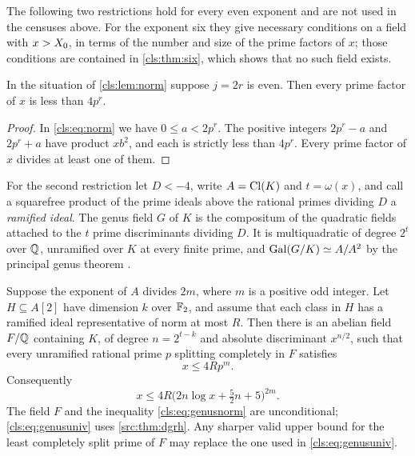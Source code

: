 The following two restrictions hold for every even exponent and are not used in the
censuses above. For the exponent six they give necessary conditions on a field with
$x>X_0$, in terms of the number and size of the prime factors of $x$; those conditions
are contained in \cref{cls:thm:six}, which shows that no such field exists.

\begin{lemma}\label{cls:lem:pplus}
In the situation of \cref{cls:lem:norm} suppose $j=2r$ is even. Then every prime factor
of $x$ is less than $4p^r$.
\end{lemma}

\begin{proof}
In \eqref{cls:eq:norm} we have $0\le a<2p^r$. The positive integers $2p^r-a$ and
$2p^r+a$ have product $xb^2$, and each is strictly less than $4p^r$. Every prime factor
of $x$ divides at least one of them.
\end{proof}

For the second restriction let $D<-4$, write $A=\operatorname{Cl}(K)$ and $t=\omega(x)$, and call a
squarefree product of the prime ideals above the rational primes dividing $D$ a
\emph{ramified ideal}. The genus field $G$ of $K$ is the compositum of the quadratic
fields attached to the $t$ prime discriminants dividing $D$. It is multiquadratic of
degree $2^t$ over $\mathbb{Q}$, unramified over $K$ at every finite prime, and
$\operatorname{Gal}(G/K)\simeq A/A^2$ by the principal genus theorem \cite[\S6]{Cox2013Primes}.

\begin{theorem}\label{cls:thm:genus}
Suppose the exponent of $A$ divides $2m$, where $m$ is a positive odd integer. Let
$H\subseteq A[2]$ have dimension $k$ over $\mathbb{F}_2$, and assume that each class in $H$ has a
ramified ideal representative of norm at most $R$. Then there is an abelian field
$F/\mathbb{Q}$ containing $K$, of degree $n=2^{t-k}$ and absolute discriminant $x^{n/2}$, such
that every unramified rational prime $p$ splitting completely in $F$ satisfies
\begin{equation}\label{cls:eq:genusnorm}
                         x\le4Rp^m .
\end{equation}
Consequently
\begin{equation}\label{cls:eq:genusuniv}
 x\le4R\bigl(2n\log x+\tfrac52n+5\bigr)^{2m}.
\end{equation}
The field $F$ and the inequality \eqref{cls:eq:genusnorm} are unconditional;
\eqref{cls:eq:genusuniv} uses \cref{src:thm:dgrh}. Any sharper valid upper bound for the
least completely split prime of $F$ may replace the one used in
\eqref{cls:eq:genusuniv}.
\end{theorem}

